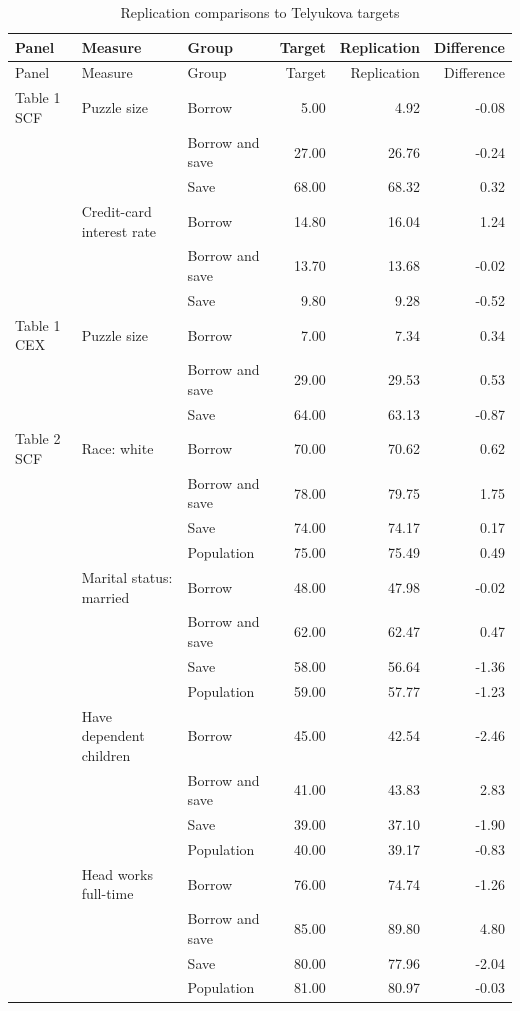 \begin{longtable}{lllrrr}
\caption{Replication comparisons to Telyukova targets}\label{tab:telyukova-final-replication}\\
\toprule
Panel & Measure & Group & Target & Replication & Difference \\
\midrule
\endfirsthead
\toprule
Panel & Measure & Group & Target & Replication & Difference \\
\midrule
\endhead
Table 1 SCF & Puzzle size & Borrow & 5.00 & 4.92 & -0.08 \\
 &  & Borrow and save & 27.00 & 26.76 & -0.24 \\
 &  & Save & 68.00 & 68.32 & 0.32 \\
 & Credit-card interest rate & Borrow & 14.80 & 16.04 & 1.24 \\
 &  & Borrow and save & 13.70 & 13.68 & -0.02 \\
 &  & Save & 9.80 & 9.28 & -0.52 \\
Table 1 CEX & Puzzle size & Borrow & 7.00 & 7.34 & 0.34 \\
 &  & Borrow and save & 29.00 & 29.53 & 0.53 \\
 &  & Save & 64.00 & 63.13 & -0.87 \\
Table 2 SCF & Race: white & Borrow & 70.00 & 70.62 & 0.62 \\
 &  & Borrow and save & 78.00 & 79.75 & 1.75 \\
 &  & Save & 74.00 & 74.17 & 0.17 \\
 &  & Population & 75.00 & 75.49 & 0.49 \\
 & Marital status: married & Borrow & 48.00 & 47.98 & -0.02 \\
 &  & Borrow and save & 62.00 & 62.47 & 0.47 \\
 &  & Save & 58.00 & 56.64 & -1.36 \\
 &  & Population & 59.00 & 57.77 & -1.23 \\
 & Have dependent children & Borrow & 45.00 & 42.54 & -2.46 \\
 &  & Borrow and save & 41.00 & 43.83 & 2.83 \\
 &  & Save & 39.00 & 37.10 & -1.90 \\
 &  & Population & 40.00 & 39.17 & -0.83 \\
 & Head works full-time & Borrow & 76.00 & 74.74 & -1.26 \\
 &  & Borrow and save & 85.00 & 89.80 & 4.80 \\
 &  & Save & 80.00 & 77.96 & -2.04 \\
 &  & Population & 81.00 & 80.97 & -0.03 \\

\end{longtable}
